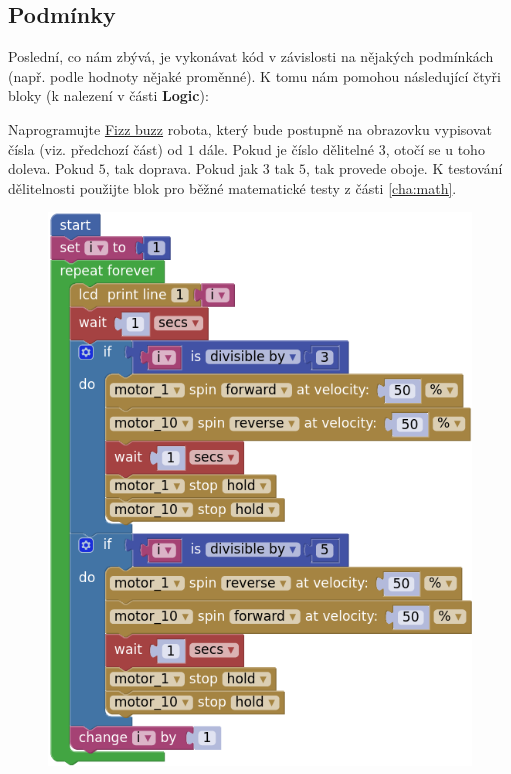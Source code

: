 \documentclass[../main.tex]{subfiles}
\begin{document}
	\subsection{Podmínky}\label{cha:logic}
	Poslední, co nám zbývá, je vykonávat kód v závislosti na nějakých podmínkách (např. podle hodnoty nějaké proměnné). K tomu nám pomohou následující čtyři bloky (k nalezení v části \textbf{Logic}):
	\begin{itemize}
		\blockLogicIf
		\blockLogicIfElse
		\blockLogicComparison
		\blockLogicOperator
	\end{itemize}

	\begin{question*}
		Naprogramujte \href{https://en.wikipedia.org/wiki/Fizz\_buzz}{Fizz buzz} robota, který bude postupně na obrazovku vypisovat čísla (viz. předchozí část) od $1$ dále. Pokud je číslo dělitelné $3$, otočí se u toho doleva. Pokud $5$, tak doprava. Pokud jak $3$ tak $5$, tak provede oboje. K testování dělitelnosti použijte blok pro běžné matematické testy z části \ref{cha:math}.
	\end{question*}

	\begin{solution}
		\begin{figure}
			\centering
			\begin{minipage}{0.5\textwidth}
				\includegraphics[width=\linewidth]{Images/05/solfb.png}
			\end{minipage}
		\end{figure}
	\end{solution}
\end{document}
